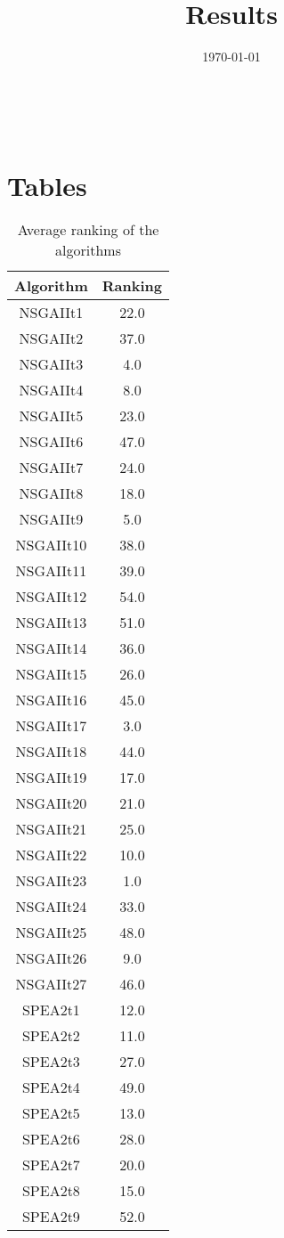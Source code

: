 \documentclass{article}
\title{Results}
\author{}
\date{\today}
\begin{document}
\oddsidemargin 0in \topmargin 0in\maketitle
\
\section{Tables}
\begin{table}[!htp]
\centering
\caption{Average ranking of the algorithms}
\begin{tabular}{c|c}
Algorithm&Ranking\\
\hline
NSGAIIt1&22.0\\
NSGAIIt2&37.0\\
NSGAIIt3&4.0\\
NSGAIIt4&8.0\\
NSGAIIt5&23.0\\
NSGAIIt6&47.0\\
NSGAIIt7&24.0\\
NSGAIIt8&18.0\\
NSGAIIt9&5.0\\
NSGAIIt10&38.0\\
NSGAIIt11&39.0\\
NSGAIIt12&54.0\\
NSGAIIt13&51.0\\
NSGAIIt14&36.0\\
NSGAIIt15&26.0\\
NSGAIIt16&45.0\\
NSGAIIt17&3.0\\
NSGAIIt18&44.0\\
NSGAIIt19&17.0\\
NSGAIIt20&21.0\\
NSGAIIt21&25.0\\
NSGAIIt22&10.0\\
NSGAIIt23&1.0\\
NSGAIIt24&33.0\\
NSGAIIt25&48.0\\
NSGAIIt26&9.0\\
NSGAIIt27&46.0\\
SPEA2t1&12.0\\
SPEA2t2&11.0\\
SPEA2t3&27.0\\
SPEA2t4&49.0\\
SPEA2t5&13.0\\
SPEA2t6&28.0\\
SPEA2t7&20.0\\
SPEA2t8&15.0\\
SPEA2t9&52.0\\

\end{tabular}
\end{table}
\end{document}
